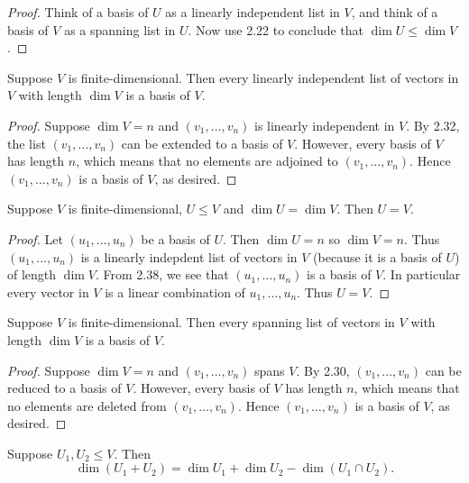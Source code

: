 \begin{proof}
Think of a basis of $U$ as a linearly independent list in $V$, and think of a basis of $V$ as a spanning list in $U$. Now use 2.22 to conclude that $\dim U\le\dim V$.
\end{proof}

\begin{proposition}
Suppose $V$ is finite-dimensional. Then every linearly independent list of vectors in $V$ with length $\dim V$ is a basis of $V$.
\end{proposition}

\begin{proof}
Suppose $\dim V=n$ and $(v_1,\dots,v_n)$ is linearly independent in $V$. By 2.32, the list $(v_1,\dots,v_n)$ can be extended to a basis of $V$. However, every basis of $V$ has length $n$, which means that no elements are adjoined to $(v_1,\dots,v_n)$. Hence $(v_1,\dots,v_n)$ is a basis of $V$, as desired.
\end{proof}

\begin{proposition}
Suppose $V$ is finite-dimensional, $U\le V$ and $\dim U=\dim V$. Then $U=V$.
\end{proposition}

\begin{proof}
Let $(u_1,\dots,u_n)$ be a basis of $U$. Then $\dim U=n$ so $\dim V=n$. Thus $(u_1,\dots,u_n)$ is a linearly indepdent list of vectors in $V$ (because it is a basis of $U$) of length $\dim V$. From 2.38, we see that $(u_1,\dots,u_n)$ is a basis of $V$. In particular every vector in $V$ is a linear combination of $u_1,\dots,u_n$. Thus $U=V$.
\end{proof}

\begin{proposition}
Suppose $V$ is finite-dimensional. Then every spanning list of vectors in $V$ with length $\dim V$ is a basis of $V$.
\end{proposition}

\begin{proof}
Suppose $\dim V=n$ and $(v_1,\dots,v_n)$ spans $V$. By 2.30, $(v_1,\dots,v_n)$ can be reduced to a basis of $V$. However, every basis of $V$ has length $n$, which means that no elements are deleted from $(v_1,\dots,v_n)$. Hence $(v_1,\dots,v_n)$ is a basis of $V$, as desired.
\end{proof}

\begin{lemma}
Suppose $U_1,U_2\le V$. Then
\[\dim(U_1+U_2)=\dim U_1+\dim U_2-\dim(U_1\cap U_2).\]
\end{lemma}